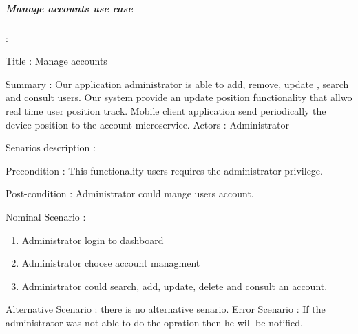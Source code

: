 \subparagraph{Manage accounts use case} :
\label{sec:sec01} 
\begin{flushleft}

Title : Manage accounts

Summary : Our application administrator is able to add, remove, update , search and consult users. 
Our system provide an update position functionality that allwo real time user position track. Mobile client application send periodically 
the device position to the account microservice.
Actors : Administrator

Senarios description :

Precondition : This functionality users requires the administrator privilege.

Post-condition : Administrator could mange users account.

Nominal Scenario :

 \begin{enumerate}
   \item Administrator login to dashboard
   \item Administrator choose account managment
   \item Administrator could search, add, update, delete and consult an account.  
 \end{enumerate}

Alternative Scenario :
there is no alternative senario.
Error Scenario :
If the administrator was not able to do the opration then he will be notified.
\end{flushleft}

